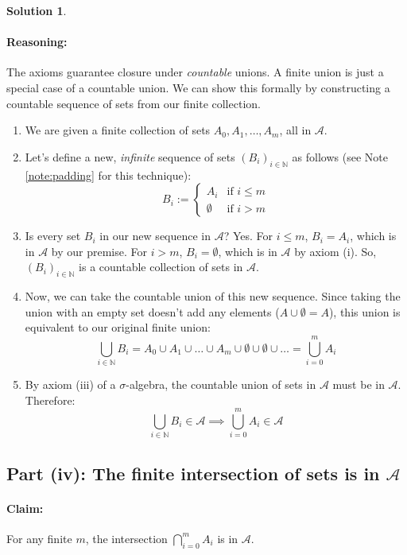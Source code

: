 \documentclass[11pt,a4paper]{article}
\theoremstyle{definition}
\newtheorem*{solution}{Solution}
\begin{document}
\begin{solution}
\paragraph{Reasoning:}
The axioms guarantee closure under \textit{countable} unions. A finite union is just a special case of a countable union. We can show this formally by constructing a countable sequence of sets from our finite collection.
\begin{enumerate}
    \item We are given a finite collection of sets $A_0, A_1, \dots, A_m$, all in $\mathcal{A}$.
    \item Let's define a new, \textit{infinite} sequence of sets $(B_i)_{i \in \mathbb{N}}$ as follows (see Note \ref{note:padding} for this technique):
    \[ B_i := \begin{cases} A_i & \text{if } i \le m \\ \emptyset & \text{if } i > m \end{cases} \]
    \item Is every set $B_i$ in our new sequence in $\mathcal{A}$? Yes. For $i \le m$, $B_i = A_i$, which is in $\mathcal{A}$ by our premise. For $i > m$, $B_i = \emptyset$, which is in $\mathcal{A}$ by axiom (i). So, $(B_i)_{i \in \mathbb{N}}$ is a countable collection of sets in $\mathcal{A}$.
    \item Now, we can take the countable union of this new sequence. Since taking the union with an empty set doesn't add any elements ($A \cup \emptyset = A$), this union is equivalent to our original finite union:
    \[ \bigcup_{i \in \mathbb{N}} B_i = A_0 \cup A_1 \cup \dots \cup A_m \cup \emptyset \cup \emptyset \cup \dots = \bigcup_{i=0}^{m} A_i \]
    \item By axiom (iii) of a $\sigma$-algebra, the countable union of sets in $\mathcal{A}$ must be in $\mathcal{A}$. Therefore:
    \[ \bigcup_{i \in \mathbb{N}} B_i \in \mathcal{A} \implies \bigcup_{i=0}^{m} A_i \in \mathcal{A} \]
\end{enumerate}

\subsection*{Part (iv): The finite intersection of sets is in $\mathcal{A}$}

\paragraph{Claim:} For any finite $m$, the intersection $\bigcap_{i=0}^{m} A_i$ is in $\mathcal{A}$.


\end{solution}
\end{document}

